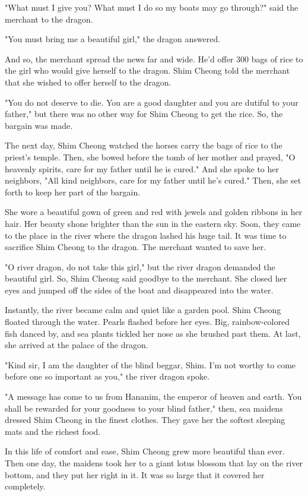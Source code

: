 "What must I give you? What must I do so my boats may go through?" said the merchant to the dragon.

"You must bring me a beautiful girl," the dragon answered.

And so, the merchant spread the news far and wide. He'd offer 300 bags of rice to the girl who would give herself to the dragon. Shim Cheong told the merchant that she wished to offer herself to the dragon.

"You do not deserve to die. You are a good daughter and you are dutiful to your father," but there was no other way for Shim Cheong to get the rice. So, the bargain was made.

The next day, Shim Cheong watched the horses carry the bags of rice to the priest's temple. Then, she bowed before the tomb of her mother and prayed, "O heavenly spirits, care for my father until he is cured." And she spoke to her neighbors, "All kind neighbors, care for my father until he's cured." Then, she set forth to keep her part of the bargain.

She wore a beautiful gown of green and red with jewels and golden ribbons in her hair. Her beauty shone brighter than the sun in the eastern sky. Soon, they came to the place in the river where the dragon lashed his huge tail. It was time to sacrifice Shim Cheong to the dragon. The merchant wanted to save her.

"O river dragon, do not take this girl," but the river dragon demanded the beautiful girl. So, Shim Cheong said goodbye to the merchant. She closed her eyes and jumped off the sides of the boat and disappeared into the water.

Instantly, the river became calm and quiet like a garden pool. Shim Cheong floated through the water. Pearls flashed before her eyes. Big, rainbow-colored fish danced by, and sea plants tickled her nose as she brushed past them. At last, she arrived at the palace of the dragon.

"Kind sir, I am the daughter of the blind beggar, Shim. I'm not worthy to come before one so important as you," the river dragon spoke.

"A message has come to us from Hananim, the emperor of heaven and earth. You shall be rewarded for your goodness to your blind father," then, sea maidens dressed Shim Cheong in the finest clothes. They gave her the softest sleeping mats and the richest food.

In this life of comfort and ease, Shim Cheong grew more beautiful than ever. Then one day, the maidens took her to a giant lotus blossom that lay on the river bottom, and they put her right in it. It was so large that it covered her completely.

